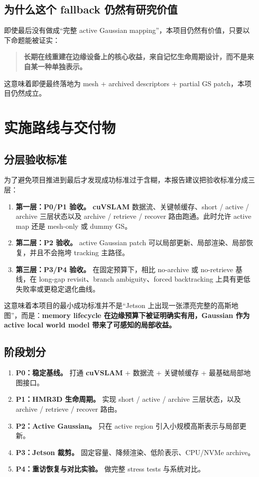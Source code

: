 \documentclass[12pt]{article}
\newcommand{\hmr}{\textbf{HMR3D}}
\newcommand{\cuvslam}{\textbf{cuVSLAM}}
\begin{document}
\subsection{为什么这个 fallback 仍然有研究价值}

即使最后没有做成“完整 active Gaussian mapping”，本项目仍然有价值，只要以下命题能被证实：
\begin{quote}
\textbf{长期在线重建在边缘设备上的核心收益，来自记忆生命周期设计，而不是来自某一种单独表示。}
\end{quote}

这意味着即便最终落地为 mesh + archived descriptors + partial GS patch，本项目仍然成立。

\section{实施路线与交付物}

\subsection{分层验收标准}

为了避免项目推进到最后才发现成功标准过于含糊，本报告建议把验收标准分成三层：
\begin{enumerate}
  \item \textbf{第一层：P0/P1 验收。} \cuvslam{} 数据流、关键帧缓存、short / active / archive 三层状态以及 archive / retrieve / recover 路由跑通。此时允许 active map 还是 mesh-only 或 dummy GS。
  \item \textbf{第二层：P2 验收。} active Gaussian patch 可以局部更新、局部渲染、局部恢复，并且不会拖垮 tracking 主路径。
  \item \textbf{第三层：P3/P4 验收。} 在固定预算下，相比 no-archive 或 no-retrieve 基线，在 long-gap revisit、branch ambiguity、forced backtracking 上具有更低失败率或更稳定退化曲线。
\end{enumerate}

这意味着本项目的最小成功标准并不是“Jetson 上出现一张漂亮完整的高斯地图”，而是：\textbf{memory lifecycle 在边缘预算下被证明确实有用，Gaussian 作为 active local world model 带来了可感知的局部收益。}

\subsection{阶段划分}

\begin{enumerate}
  \item \textbf{P0：稳定基线。} 打通 \cuvslam{} + 数据流 + 关键帧缓存 + 最基础局部地图接口。
  \item \textbf{P1：\hmr{} 生命周期。} 实现 short / active / archive 三层状态，以及 archive / retrieve / recover 路由。
  \item \textbf{P2：Active Gaussian。} 只在 active region 引入小规模高斯表示与局部更新。
  \item \textbf{P3：Jetson 裁剪。} 固定容量、降频渲染、低阶表示、CPU/NVMe archive。
  \item \textbf{P4：重访恢复与对比实验。} 做完整 stress tests 与系统对比。
\end{enumerate}
\end{document}
